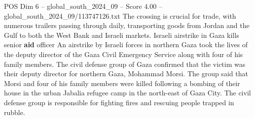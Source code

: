 \begin{textsample}{POS Dim 6 – global\_south\_2024\_09 – Score 4.00 – global\_south\_2024\_09/113747126.txt}
The crossing is crucial for trade, with numerous trailers passing through daily, transporting goods from Jordan and the Gulf to both the West Bank and Israeli markets.
Israeli airstrike in Gaza kills senior \textbf{aid} officer An airstrike by Israeli forces in northern Gaza took the lives of the deputy director of the Gaza Civil Emergency Service along with four of his family members.
The civil defense group of Gaza confirmed that the victim was their deputy director for northern Gaza, Mohammad Morsi.
The group said that Morsi and four of his family members were killed following a bombing of their house in the urban Jabalia refugee camp in the north-east of Gaza City.
The civil defense group is responsible for fighting fires and rescuing people trapped in rubble.

\end{textsample}
